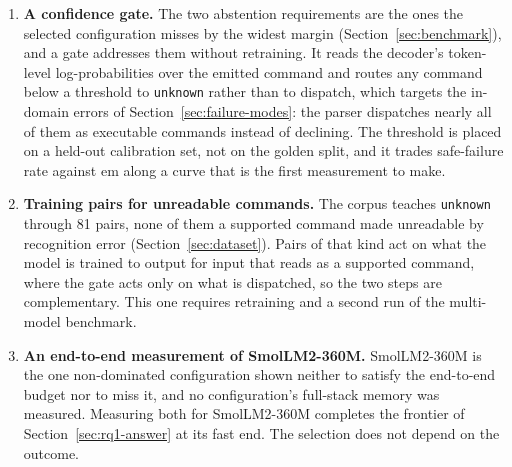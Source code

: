 \begin{enumerate}
  \item \textbf{A confidence gate.} The two abstention requirements are the ones the selected
  configuration misses by the widest margin (Section~\ref{sec:benchmark}), and a gate addresses
  them without retraining. It reads the decoder's token-level log-probabilities over the emitted
  command and routes any command below a threshold to \texttt{unknown} rather than to dispatch,
  which targets the in-domain errors of Section~\ref{sec:failure-modes}: the parser dispatches nearly
  all of them as executable commands instead of declining. The threshold is placed on a held-out calibration
  set, not on the golden split, and it trades safe-failure rate against \gls{em} along a curve that
  is the first measurement to make.
  \item \textbf{Training pairs for unreadable commands.} The corpus teaches \texttt{unknown}
  through 81 pairs, none of them a supported command made unreadable by recognition error
  (Section~\ref{sec:dataset}). Pairs of that kind act on what the model is trained to output for
  input that reads as a supported command, where the gate acts only on what is dispatched, so the
  two steps are complementary. This one requires retraining and a second run of the multi-model benchmark.
  \item \textbf{An end-to-end measurement of SmolLM2-360M.} SmolLM2-360M is the one
  non-dominated configuration shown neither to satisfy the end-to-end budget nor to miss it, and
  no configuration's full-stack memory was measured. Measuring both for SmolLM2-360M completes the
  frontier of Section~\ref{sec:rq1-answer} at its fast end. The selection does not depend on the
  outcome.
\end{enumerate}
